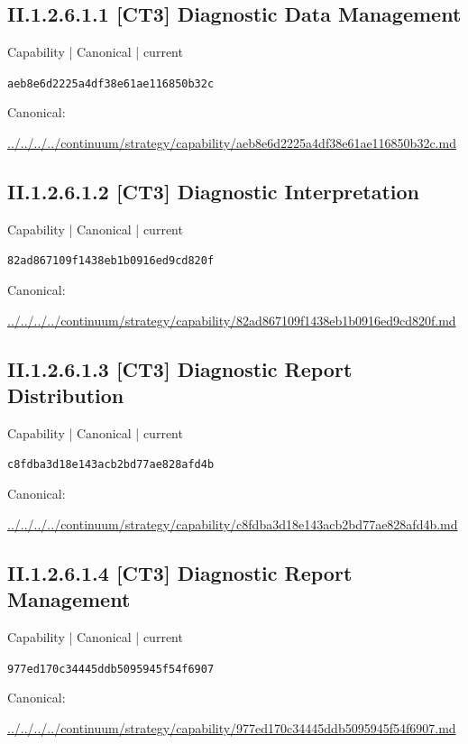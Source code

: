 \documentclass[10pt,a4paper]{article}
\begin{document}
\subsection*{II.1.2.6.1.1 [CT3] Diagnostic Data Management}
\label{element-aeb8e6d2225a4df38e61ae116850b32c}
{\small Capability | Canonical | current}\par
\texttt{aeb8e6d2225a4df38e61ae116850b32c}\par
Canonical: \par
{\footnotesize\url{../../../../continuum/strategy/capability/aeb8e6d2225a4df38e61ae116850b32c.md}}\par
\subsection*{II.1.2.6.1.2 [CT3] Diagnostic Interpretation}
\label{element-82ad867109f1438eb1b0916ed9cd820f}
{\small Capability | Canonical | current}\par
\texttt{82ad867109f1438eb1b0916ed9cd820f}\par
Canonical: \par
{\footnotesize\url{../../../../continuum/strategy/capability/82ad867109f1438eb1b0916ed9cd820f.md}}\par
\subsection*{II.1.2.6.1.3 [CT3] Diagnostic Report Distribution}
\label{element-c8fdba3d18e143acb2bd77ae828afd4b}
{\small Capability | Canonical | current}\par
\texttt{c8fdba3d18e143acb2bd77ae828afd4b}\par
Canonical: \par
{\footnotesize\url{../../../../continuum/strategy/capability/c8fdba3d18e143acb2bd77ae828afd4b.md}}\par
\subsection*{II.1.2.6.1.4 [CT3] Diagnostic Report Management}
\label{element-977ed170c34445ddb5095945f54f6907}
{\small Capability | Canonical | current}\par
\texttt{977ed170c34445ddb5095945f54f6907}\par
Canonical: \par
{\footnotesize\url{../../../../continuum/strategy/capability/977ed170c34445ddb5095945f54f6907.md}}\par
\end{document}
